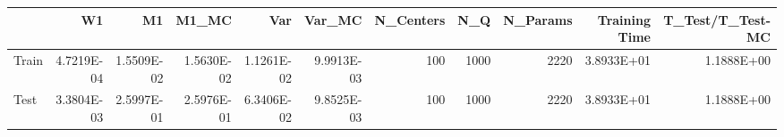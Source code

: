 \begin{tabular}{lrrrrrrrrrr}
\toprule
{} &         W1 &         M1 &      M1\_MC &        Var &     Var\_MC &  N\_Centers &   N\_Q &  N\_Params &  Training Time &  T\_Test/T\_Test-MC \\
\midrule
Train & 4.7219E-04 & 1.5509E-02 & 1.5630E-02 & 1.1261E-02 & 9.9913E-03 &        100 &  1000 &      2220 &     3.8933E+01 &        1.1888E+00 \\
Test  & 3.3804E-03 & 2.5997E-01 & 2.5976E-01 & 6.3406E-02 & 9.8525E-03 &        100 &  1000 &      2220 &     3.8933E+01 &        1.1888E+00 \\
\bottomrule
\end{tabular}
